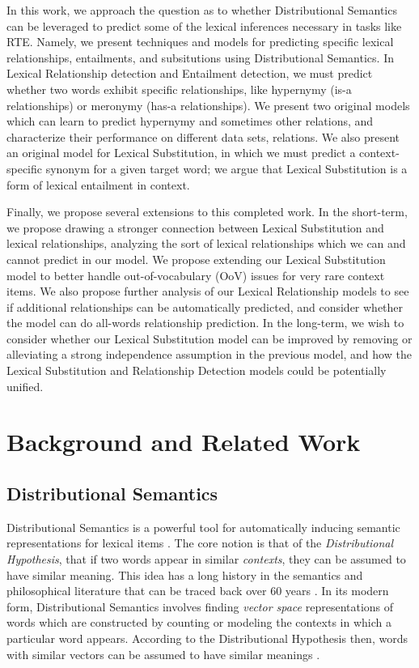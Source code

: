 \documentclass[letterpaper]{article}
\begin{document}
In this work, we approach the question as to whether Distributional Semantics
can be leveraged to predict some of the lexical inferences necessary in tasks
like RTE. Namely, we present techniques and models for predicting specific
lexical relationships, entailments, and subsitutions using Distributional
Semantics. In Lexical Relationship detection and Entailment detection, we must
predict whether two words exhibit specific relationships, like hypernymy (is-a
relationships) or meronymy (has-a relationships). We present two original
models which can learn to predict hypernymy and sometimes other relations,
and characterize their performance on different data sets, relations. We also
present an original model for Lexical Substitution, in which we must predict a
context-specific synonym for a given target word; we argue that Lexical
Substitution is a form of lexical entailment in context.

Finally, we propose several extensions to this completed work. In the
short-term, we propose drawing a stronger connection between Lexical
Substitution and lexical relationships, analyzing the sort of lexical
relationships which we can and cannot predict in our model. We propose
extending our Lexical Substitution model to better handle out-of-vocabulary
(OoV) issues for very rare context items. We also propose further analysis of
our Lexical Relationship models to see if additional relationships can be
automatically predicted, and consider whether the model can do all-words
relationship prediction.  In the long-term, we wish to consider whether our
Lexical Substitution model can be improved by removing or alleviating a strong
independence assumption in the previous model, and how the Lexical Substitution
and Relationship Detection models could be potentially unified.

\section{Background and Related Work}

\subsection{Distributional Semantics}
Distributional Semantics is a powerful tool for automatically inducing semantic
representations for lexical items \cite{turney:2010:jair,erk:2012:llc}.  The
core notion is that of the {\em Distributional Hypothesis}, that if two words
appear in similar {\em contexts}, they can be assumed to have similar meaning.
This idea has a long history in the semantics and philosophical literature that
can be traced back over 60 years
\cite{wittgenstein:1953:pi,harris:1954:word,firth:1957:la}. In its modern form,
Distributional Semantics involves finding {\em vector space} representations of
words which are constructed by counting or modeling the contexts in which a
particular word appears. According to the Distributional Hypothesis then, words
with similar vectors can be assumed to have similar meanings
\cite{turney:2010:jair}.
\end{document}
